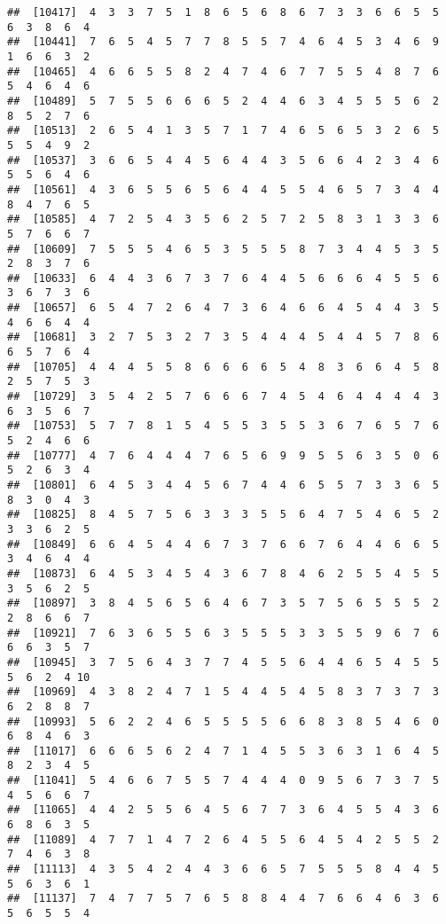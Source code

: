 \documentclass[
]{book}
\begin{document}
\begin{verbatim}
##  [10417]  4  3  3  7  5  1  8  6  5  6  8  6  7  3  3  6  6  5  5  6  3  8  6  4
##  [10441]  7  6  5  4  5  7  7  8  5  5  7  4  6  4  5  3  4  6  9  1  6  6  3  2
##  [10465]  4  6  6  5  5  8  2  4  7  4  6  7  7  5  5  4  8  7  6  5  4  6  4  6
##  [10489]  5  7  5  5  6  6  6  5  2  4  4  6  3  4  5  5  5  6  2  8  5  2  7  6
##  [10513]  2  6  5  4  1  3  5  7  1  7  4  6  5  6  5  3  2  6  5  5  5  4  9  2
##  [10537]  3  6  6  5  4  4  5  6  4  4  3  5  6  6  4  2  3  4  6  5  5  6  4  6
##  [10561]  4  3  6  5  5  6  5  6  4  4  5  5  4  6  5  7  3  4  4  8  4  7  6  5
##  [10585]  4  7  2  5  4  3  5  6  2  5  7  2  5  8  3  1  3  3  6  5  7  6  6  7
##  [10609]  7  5  5  5  4  6  5  3  5  5  5  8  7  3  4  4  5  3  5  2  8  3  7  6
##  [10633]  6  4  4  3  6  7  3  7  6  4  4  5  6  6  6  4  5  5  6  3  6  7  3  6
##  [10657]  6  5  4  7  2  6  4  7  3  6  4  6  6  4  5  4  4  3  5  4  6  6  4  4
##  [10681]  3  2  7  5  3  2  7  3  5  4  4  4  5  4  4  5  7  8  6  6  5  7  6  4
##  [10705]  4  4  4  5  5  8  6  6  6  6  5  4  8  3  6  6  4  5  8  2  5  7  5  3
##  [10729]  3  5  4  2  5  7  6  6  6  7  4  5  4  6  4  4  4  4  3  6  3  5  6  7
##  [10753]  5  7  7  8  1  5  4  5  5  3  5  5  3  6  7  6  5  7  6  5  2  4  6  6
##  [10777]  4  7  6  4  4  4  7  6  5  6  9  9  5  5  6  3  5  0  6  5  2  6  3  4
##  [10801]  6  4  5  3  4  4  5  6  7  4  4  6  5  5  7  3  3  6  5  8  3  0  4  3
##  [10825]  8  4  5  7  5  6  3  3  3  5  5  6  4  7  5  4  6  5  2  3  3  6  2  5
##  [10849]  6  6  4  5  4  4  6  7  3  7  6  6  7  6  4  4  6  6  5  3  4  6  4  4
##  [10873]  6  4  5  3  4  5  4  3  6  7  8  4  6  2  5  5  4  5  5  3  5  6  2  5
##  [10897]  3  8  4  5  6  5  6  4  6  7  3  5  7  5  6  5  5  5  2  2  8  6  6  7
##  [10921]  7  6  3  6  5  5  6  3  5  5  5  3  3  5  5  9  6  7  6  6  6  3  5  7
##  [10945]  3  7  5  6  4  3  7  7  4  5  5  6  4  4  6  5  4  5  5  5  6  2  4 10
##  [10969]  4  3  8  2  4  7  1  5  4  4  5  4  5  8  3  7  3  7  3  6  2  8  8  7
##  [10993]  5  6  2  2  4  6  5  5  5  5  6  6  8  3  8  5  4  6  0  6  8  4  6  3
##  [11017]  6  6  6  5  6  2  4  7  1  4  5  5  3  6  3  1  6  4  5  8  2  3  4  5
##  [11041]  5  4  6  6  7  5  5  7  4  4  4  0  9  5  6  7  3  7  5  4  5  6  6  7
##  [11065]  4  4  2  5  5  6  4  5  6  7  7  3  6  4  5  5  4  3  6  6  8  6  3  5
##  [11089]  4  7  7  1  4  7  2  6  4  5  5  6  4  5  4  2  5  5  2  7  4  6  3  8
##  [11113]  4  3  5  4  2  4  4  3  6  6  5  7  5  5  5  8  4  4  5  5  6  3  6  1
##  [11137]  7  4  7  7  5  7  6  5  8  8  4  4  7  6  6  4  6  3  6  5  6  5  5  4

\end{verbatim}
\end{document}
